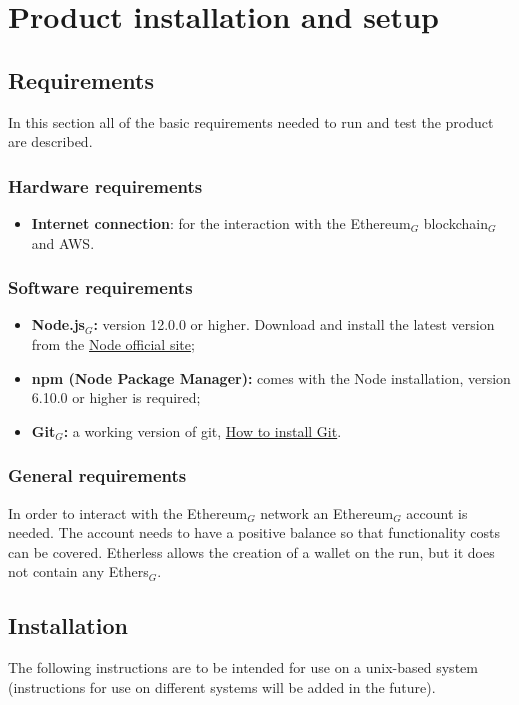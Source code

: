 \section{Product installation and setup}
  \subsection{Requirements}
    In this section all of the basic requirements needed to run and test the product are described.
    \subsubsection{Hardware requirements}
      \begin{itemize}
      	\item \textbf{Internet connection}: for the interaction with the Ethereum$_{G}$ blockchain$_{G}$ and AWS.
      \end{itemize}
    \subsubsection{Software requirements}
      \begin{itemize}
        \item \textbf{Node.js$_{G}$:} version 12.0.0 or higher. Download and install the latest version from the \href{https://nodejs.org/it/download/}{Node official site};
        \item \textbf{npm (Node Package Manager):} comes with the Node installation, version 6.10.0 or higher is required;
        \item \textbf{Git$_{G}$:} a working version of git, \href{https://git-scm.com/book/en/v2/Getting-Started-Installing-Git}{How to install Git}.
      \end{itemize}
    \subsubsection{General requirements}
      In order to interact with the Ethereum$_{G}$ network an Ethereum$_{G}$ account is needed. The account needs to have a positive balance so that functionality costs can be covered. Etherless allows the creation of a wallet on the run, but it does not contain any Ethers$_{G}$.
  \subsection{Installation}
    The following instructions are to be intended for use on a unix-based system (instructions for use on different systems will be added in the future).
